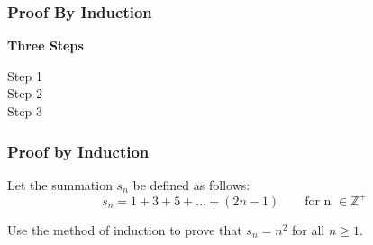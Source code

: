 \documentclass{beamer}
\begin{document}

\begin{frame}
\frametitle{Proof By Induction}
\Large
\textbf{Three Steps}
\begin{description}
\item[Step 1]
\item[Step 2]
\item[Step 3]
\end{description}

\end{frame}
\begin{frame}
\frametitle{Proof by Induction}
\Large
Let the summation $s_n$ be defined as follows:
\[s_n = 1 + 3 + 5 + \ldots + (2n - 1) \qquad \mbox{for n }\in \mathbb{Z}^{+}\]

Use the method of induction to prove that $s_n = n^2$ for all $n \geq 1$.
\end{frame}

\end{document}
